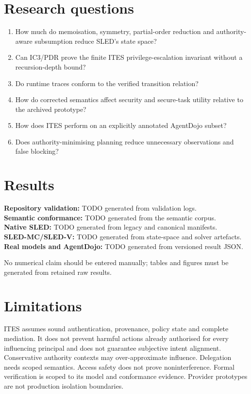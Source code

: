 \documentclass[11pt]{article}
\begin{document}
\section{Research questions}
\begin{enumerate}[leftmargin=*]
\item How much do memoisation, symmetry, partial-order reduction and authority-aware subsumption reduce SLED's state space?
\item Can IC3/PDR prove the finite ITES privilege-escalation invariant without a recursion-depth bound?
\item Do runtime traces conform to the verified transition relation?
\item How do corrected semantics affect security and secure-task utility relative to the archived prototype?
\item How does ITES perform on an explicitly annotated AgentDojo subset?
\item Does authority-minimising planning reduce unnecessary observations and false blocking?
\end{enumerate}

\section{Results}
\textbf{Repository validation:} TODO generated from validation logs.\\
\textbf{Semantic conformance:} TODO generated from the semantic corpus.\\
\textbf{Native SLED:} TODO generated from legacy and canonical manifests.\\
\textbf{SLED-MC/SLED-V:} TODO generated from state-space and solver artefacts.\\
\textbf{Real models and AgentDojo:} TODO generated from versioned result JSON.

No numerical claim should be entered manually; tables and figures must be generated from retained raw results.

\section{Limitations}
ITES assumes sound authentication, provenance, policy state and complete mediation. It does not prevent harmful actions already authorised for every influencing principal and does not guarantee subjective intent alignment. Conservative authority contexts may over-approximate influence. Delegation needs scoped semantics. Access safety does not prove noninterference. Formal verification is scoped to its model and conformance evidence. Provider prototypes are not production isolation boundaries.
\end{document}
